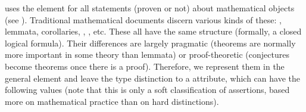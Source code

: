 {\omdoc} uses the {} element for all statements (proven or not)
about mathematical objects (see {}).  Traditional mathematical
documents discern various kinds of these: {}, lemmata,
corollaries, {}, {}, etc. These
all have the same structure (formally, a closed logical formula). Their
differences are largely pragmatic (theorems are normally more important in
some theory than lemmata) or proof-theoretic (conjectures become theorems once
there is a proof).  Therefore, we represent them in the general
{} element and leave the type distinction to a
{} attribute, which can have the following values (note
that this is only a soft classification of assertions, based more on mathematical
practice than on hard distinctions).
